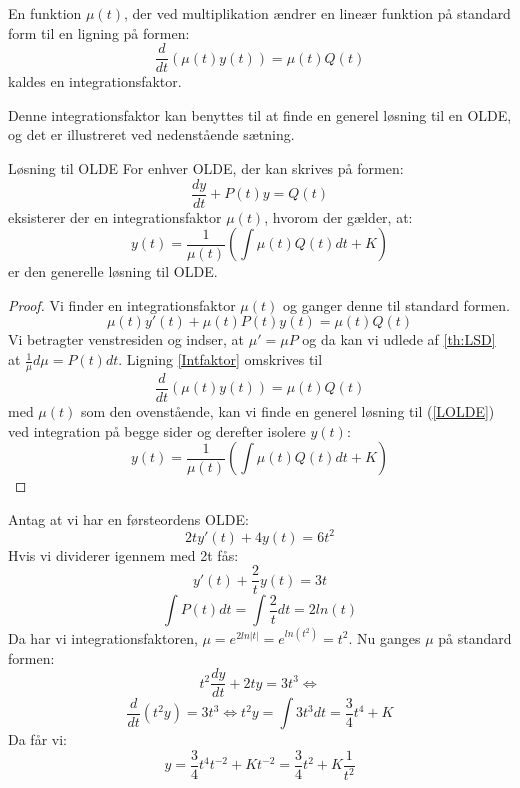 \begin{definition}[Integrationsfaktor]
\label{integrationsfaktor}
En funktion $\mu (t)$, der ved multiplikation ændrer en lineær funktion på standard form til en ligning på formen: $$\frac{d}{dt}(\mu (t)y(t)) = \mu (t)Q(t)$$ kaldes en integrationsfaktor.
\end{definition}

Denne integrationsfaktor kan benyttes til at finde en generel løsning til en OLDE, og det er illustreret ved nedenstående sætning.

\begin{mytheo}{Løsning til OLDE}{}
For enhver OLDE, der kan skrives på formen:
\begin{equation}\label{LOLDE}
\frac{dy}{dt}+P(t)y=Q(t)
\end{equation}
eksisterer der en integrationsfaktor $\mu(t)$, hvorom der gælder, at: $$y(t)=\frac{1}{\mu (t)}(\int \mu (t)Q(t)dt+K)$$ er den generelle løsning til OLDE.
\end{mytheo}

\begin{proof}
Vi finder en integrationsfaktor $\mu(t)$ og ganger denne til standard formen.
\begin{equation}\label{Intfaktor}
\mu (t)y'(t) + \mu (t)P(t)y(t) = \mu (t)Q(t) 
\end{equation}
Vi betragter venstresiden og indser, at $\mu ' = \mu P$ og da kan vi udlede af \ref{th:LSD} at $\frac{1}{\mu}d\mu = P(t)dt$.
Ligning \eqref{Intfaktor} omskrives til $$\frac{d}{dt}(\mu (t)y(t)) = \mu (t)Q(t)$$ 
med $\mu (t)$ som den ovenstående, kan vi finde en generel løsning til (\ref{LOLDE}) ved integration på begge sider og derefter isolere $y(t)$:
\begin{equation}
y(t)=\frac{1}{\mu (t)}(\int \mu (t)Q(t)dt+K)
\end{equation}
\end{proof}

\begin{Example}
\textnormal{Antag at vi har en førsteordens OLDE:}
$$2ty'(t) + 4y(t) = 6t^2$$
\textnormal{Hvis vi dividerer igennem med 2t fås:}
$$y'(t) + \frac{2}{t}y(t) = 3t$$
$$\int P(t)dt = \int \frac{2}{t}dt = 2ln(t)$$
\textnormal{Da har vi integrationsfaktoren,} $\mu = e^{2ln|t|} = e^{ln(t^2)} = t^2$. \textnormal{Nu ganges $\mu$ på standard formen:}
$$t^2 \frac{dy}{dt} + 2ty = 3t^3\Leftrightarrow$$
$$\frac{d}{dt}(t^2y) = 3t^3 \Leftrightarrow  t^2y = \int 3t^3dt = \frac{3}{4}t^4 + K$$
\textnormal{Da får vi:} 
$$y = \frac{3}{4}t^4t^{-2} + Kt^{-2} = \frac{3}{4}t^2 + K \frac{1}{t^2}$$
\end{Example}

